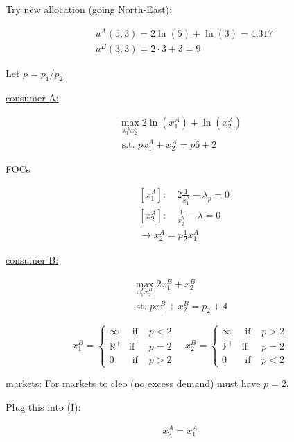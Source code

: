 {\begin{enumerate}[label=(\alph*)]
{Try new allocation (going North-East):

$$
\begin{aligned}
& u^{A}(5,3)=2 \ln (5)+\ln (3)=4.317 \\
& u^{B}(3,3)=2 \cdot 3+3=9
\end{aligned}
$$
}
{\item 
Let $p=p_{1} / p_{2}$

\underline{consumer A:}

\begin{align*}
    \max _{x_{1}^{A} x_{2}^{A}} 2 \ln \left(x_{1}^{A}\right)+\ln \left(x_{2}^{A}\right) \\
    \text{ s.t. } p x_{1}^{A}+x_{2}^{A}=p 6+2 
\end{align*}

FOCs

\begin{align*}
& \left[x_{1}^{A}\right]: \quad 2 \frac{1}{x_{1}^{\lambda}}-\lambda_{p}=0 \\
& \left[x_{2}^{A}\right]: \quad \frac{1}{x_{2}^{\lambda}}-\lambda=0 \\
& \longrightarrow x_{2}^{A}=p \frac{1}{2} x_{1}^{A} \tag{I}
\end{align*}

\underline{consumer B:}

\begin{align*}
    \max _{x_{1}^{P} x_{2}^{B}} 2 x_{1}^{B}+x_{2}^{B} \\
    \text { st. } p x_{1}^{B}+x_{2}^{B}=p_{2}+4
\end{align*}

$$
x_{1}^{B}=\left\{\begin{array}{lll}
\infty & \text { if } & p<2 \\
\mathbb{R}^{+} & \text {if } & p=2 \\
0 & \text { if } & p>2
\end{array} \quad x_{2}^{B}=\left\{\begin{array}{lll}
\infty & \text { if } & p>2 \\
\mathbb{R}^{+} & \text {if } & p=2 \\
0 & \text { if } & p<2
\end{array}\right.\right.
$$

markets: For markets to cleo (no excess demand) must have $p=2$.

Plug this into (I):

\begin{align*}
    x_{2}^{A}=x_{1}^{A} \tag{II}
\end{align*}

}
\end{enumerate}}

